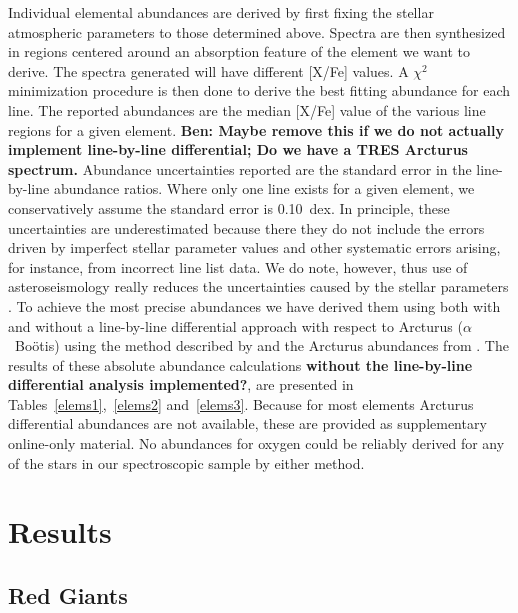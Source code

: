 \documentclass[a4paper,fleqn,usenatbib]{mnras}
\begin{document}
Individual elemental abundances are derived by first fixing the stellar atmospheric parameters to those determined above. Spectra are then synthesized  in regions centered around an absorption  feature of the element we want to derive. The spectra generated will have different [X/Fe] values. A $\chi^2$ minimization procedure is then done to derive the best fitting abundance for each line. The reported abundances are the median [X/Fe] value of the various line regions for a given element. { \bf Ben: Maybe remove this if we do not actually implement line-by-line differential; Do we have a TRES Arcturus spectrum.} Abundance uncertainties reported are the standard error in the line-by-line abundance ratios. Where only one line exists for a given element, we conservatively assume the standard error is 0.10~dex. In principle, these uncertainties are underestimated because there they do not include the errors driven by imperfect stellar parameter values and other systematic errors arising, for instance, from incorrect line list data. We do note, however, thus use of asteroseismology really reduces the uncertainties caused by the stellar parameters \citep[see][for a longer discussion on this]{hawkinsapogee}. To achieve the most precise abundances we have derived them using  both with and without a line-by-line differential approach with respect to Arcturus ($\alpha$~Bo\"{o}tis) using the method described by \citet{gaiabenchmark4} and the Arcturus abundances from \citep{hawkinsapogee}. The results of these absolute abundance calculations {\bf without the line-by-line differential analysis implemented?}, are presented in Tables~\ref{elems1},~\ref{elems2} and~\ref{elems3}. Because for most elements Arcturus differential abundances are not available, these are provided as supplementary online-only material. No abundances for oxygen could be reliably derived for any of the stars in our spectroscopic sample by either method.







\section{Results}
\label{targets}

\subsection{Red Giants}
\label{rgs}
\end{document}
